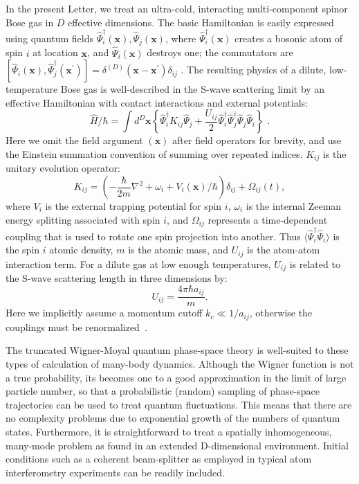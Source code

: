 \documentclass[aps,prl,twocolumn,showpacs,amsmath,amssymb,superscriptaddress]{revtex4-1}
\newcommand{\xvec}{\boldsymbol{x}}
\begin{document}
In the present Letter, we treat an ultra-cold,
interacting multi-component spinor Bose gas in $D$ effective dimensions.
The basic Hamiltonian is easily expressed using quantum fields
$\widehat{\Psi}_{i}^{\dagger}(\xvec),\widehat{\Psi}_{j}(\xvec)$,
where $\widehat{\Psi}_{i}^{\dagger}(\xvec)$ creates a bosonic atom of spin $i$
at location $\xvec$, and $\widehat{\Psi}_{i}(\xvec)$ destroys one;
the commutators are
$[\widehat{\Psi}_{i}(\xvec),\widehat{\Psi}_{j}^{\dagger}(\xvec^\prime)] =
\delta^{(D)}(\xvec-\xvec^\prime)\delta_{ij}\,\,.$
The resulting physics of a dilute, low-temperature Bose gas
is well-described in the S-wave scattering limit by an effective Hamiltonian
with contact interactions and external potentials:
\begin{equation}
	\hat{H} / \hbar = \int d^{D}\xvec \left\{
		\widehat{\Psi}_{i}^{\dagger} K_{ij} \widehat{\Psi}_{j} +
		\frac{U_{ij}}{2} \widehat{\Psi}_{i}^{\dagger} \widehat{\Psi}_{j}^{\dagger}
		\widehat{\Psi}_{j} \widehat{\Psi}_{i}
	\right\} \,\,.
\end{equation}
Here we omit the field argument $(\xvec)$ after field operators for brevity,
and use the Einstein summation convention of summing over repeated indices.
$K_{ij}$ is the unitary evolution operator:
\begin{equation}
	K_{ij} = \left( -\frac{\hbar}{2m} \nabla^2 + \omega_i + V_i(\xvec) / \hbar \right) \delta_{ij} +
		\Omega_{ij}(t),
\end{equation}
where $V_{i}$ is the external trapping potential for spin $i$,
$\omega_{i}$ is the internal Zeeman energy splitting associated with spin $i$,
and $\Omega_{ij}$ represents a time-dependent coupling
that is used to rotate one spin projection into another.
Thus $\langle \widehat{\Psi}_{i}^{\dagger} \widehat{\Psi}_{i} \rangle$
is the spin $i$ atomic density, $m$ is the atomic mass,
and $U_{ij}$ is the atom-atom interaction term.
For a dilute gas at low enough temperatures,
$U_{ij}$ is related to the S-wave scattering length in three dimensions by:
\begin{equation}
	U_{ij}=\frac{4\pi\hbar a_{ij}}{m}.
\end{equation}
Here we implicitly assume a momentum cutoff $k_{c} \ll 1 / a_{ij}$,
otherwise the couplings must be renormalized~\cite{Sinatra2002}.

The truncated Wigner-Moyal quantum phase-space theory is well-suited
to these types of calculation of many-body dynamics.
Although the Wigner function is not a true probability,
its becomes one to a good approximation in the limit of large particle number,
so that a probabilistic (random) sampling of phase-space trajectories
can be used to treat quantum fluctuations.
This means that there are no complexity problems due to exponential growth
of the numbers of quantum states.
Furthermore, it is straightforward to treat a spatially inhomogeneous,
many-mode problem as found in an extended D-dimensional environment.
Initial conditions such as a coherent beam-splitter
as employed in typical atom interferometry experiments can be readily included.
\end{document}
